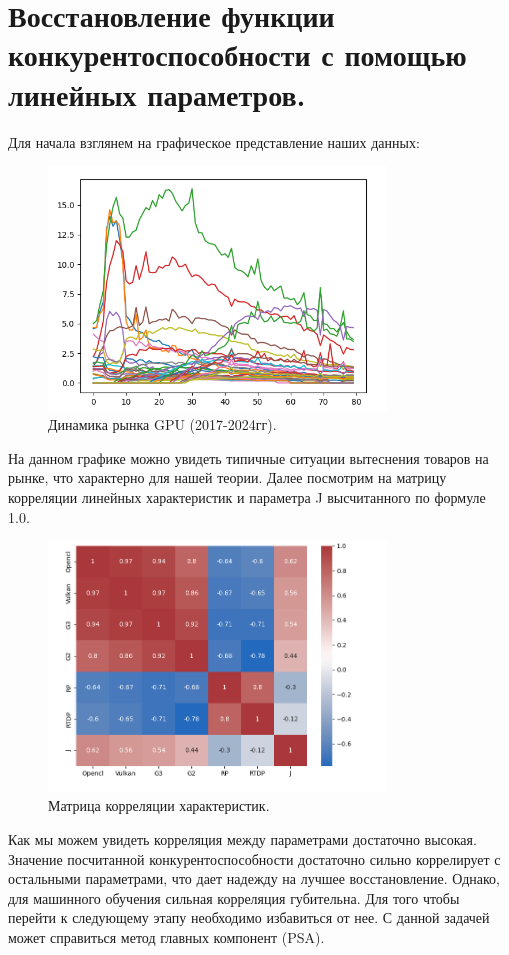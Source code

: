 \documentclass[14pt, a4paper]{extarticle}
\begin{document}
  \section{Восстановление функции конкурентоспособности с помощью линейных параметров.}
Для начала взглянем на графическое представление наших данных:
\begin{figure}[h]
  \centering
  \includegraphics[width=0.8\textwidth]{./img/linear/graph-data.png}
  \caption{Динамика рынка GPU (2017-2024гг).}
  \label{fig:example}
\end{figure}
\newline
На данном графике можно увидеть типичные ситуации вытеснения товаров на рынке, что характерно для нашей теории.
\newpage
Далее посмотрим на матрицу корреляции линейных характеристик и параметра J высчитанного по формуле 1.0.
\begin{figure}[h]
  \centering
  \includegraphics[width=0.8\textwidth]{./img/linear/corr.png}
  \caption{Матрица корреляции характеристик.}
  \label{fig:example}
\end{figure}
\newline
Как мы можем увидеть корреляция между параметрами достаточно высокая. Значение посчитанной конкурентоспособности достаточно сильно коррелирует с остальными параметрами, что дает надежду на лучшее восстановление. Однако, для машинного обучения сильная корреляция губительна. Для того чтобы перейти к следующему этапу
необходимо избавиться от нее. С данной задачей может справиться метод главных компонент (PSA).
\end{document}
